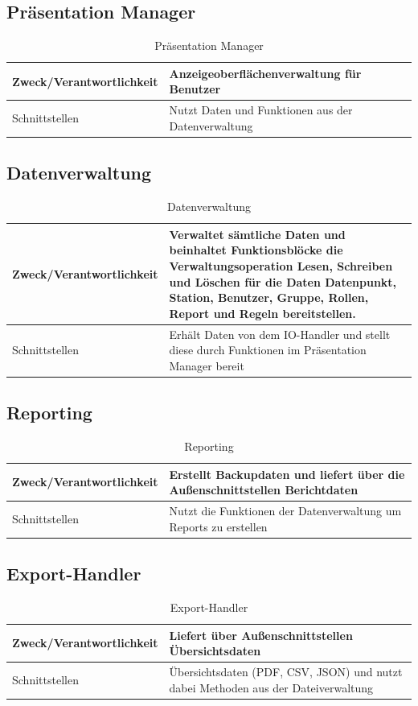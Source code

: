 \subsection{Präsentation Manager}
\begin{table}[th]
	\begin{tabularx}{\textwidth}{X X}
		\hline
		Zweck/Verantwortlichkeit & Anzeigeoberflächenverwaltung für Benutzer \\
		\hline
		Schnittstellen & Nutzt Daten und Funktionen aus der Datenverwaltung\\
		\hline
	\end{tabularx} 
	\caption{Präsentation Manager}
	\label{tab:Präsentation Manager}
\end{table}

\subsection{Datenverwaltung}
\begin{table}[th]
	\begin{tabularx}{\textwidth}{X X}
		\hline
		Zweck/Verantwortlichkeit & Verwaltet sämtliche Daten und beinhaltet Funktionsblöcke die Verwaltungsoperation Lesen, Schreiben und Löschen für die Daten Datenpunkt, Station, Benutzer, Gruppe, Rollen, Report und Regeln bereitstellen. \\
		\hline
		Schnittstellen & Erhält Daten von dem IO-Handler und stellt diese durch Funktionen im Präsentation Manager bereit\\
		\hline
	\end{tabularx} 
	\caption{Datenverwaltung}
	\label{Datenverwaltung}
\end{table}
\clearpage
\subsection{Reporting}
\begin{table}[th]
	\begin{tabularx}{\textwidth}{p{5cm} X}
		\hline
		Zweck/Verantwortlichkeit & Erstellt Backupdaten und liefert über die Außenschnittstellen Berichtdaten \\
		\hline
		Schnittstellen & Nutzt die Funktionen der Datenverwaltung um Reports zu erstellen\\
		\hline
	\end{tabularx} 
	\caption{Reporting}
	\label{tab:Reporting}
\end{table}

\subsection{Export-Handler}
\begin{table}[th]
	\begin{tabularx}{\textwidth}{p{5cm} X}
		\hline
		Zweck/Verantwortlichkeit & Liefert über Außenschnittstellen Übersichtsdaten \\
		\hline
		Schnittstellen & Übersichtsdaten (PDF, CSV, JSON) und nutzt dabei Methoden aus der Dateiverwaltung\\
		\hline
	\end{tabularx} 
	\caption{Export-Handler}
	\label{tab:ExportHandler}
\end{table}

